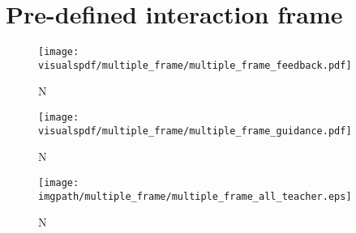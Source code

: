 













\section{Pre-defined interaction frame}


\begin{figure}[!ht]
\centering
\texttt{[image: \\visualspdf/multiple\_frame/multiple\_frame\_feedback.pdf]}
\caption{N}
\label{fig:multipleframeexplainedfeedback}
\end{figure} 

\begin{figure}[!ht]
\centering
\texttt{[image: \\visualspdf/multiple\_frame/multiple\_frame\_guidance.pdf]}
\caption{N}
\label{fig:multipleframeexplainedguidance}
\end{figure} 

\begin{figure}[!ht]
\centering
\texttt{[image: \\imgpath/multiple\_frame/multiple\_frame\_all\_teacher.eps]}
\caption{N}
\label{fig:multipleframeall}
\end{figure} 


